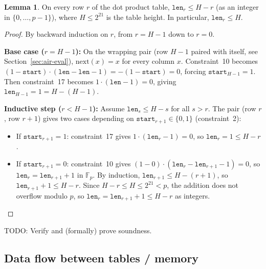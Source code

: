 \documentclass{article}
\theoremstyle{definition}
\newcommand{\Fp}{\mathbb F_p}
\newtheorem{lemma}{Lemma}
\begin{document}
\vspace{5mm}

\begin{lemma}\label{lem:len-bound}
On every row $r$ of the dot product table, $\texttt{len}_r \leq H - r$ (as an integer in $\{0, \dots, p-1\}$), where $H \leq 2^{21}$ is the table height. In particular, $\texttt{len}_r \leq H$.
\end{lemma}

\begin{proof}
By backward induction on $r$, from $r = H - 1$ down to $r = 0$.

\vspace{2mm}

\textbf{Base case ($r = H - 1$):} On the wrapping pair (row $H\!-\!1$ paired with itself, see Section~\ref{sec:air-eval}), $\text{next}(x) = x$ for every column $x$. Constraint~10 becomes $(1 - \texttt{start}) \cdot (\texttt{len} - \texttt{len} - 1) = -(1 - \texttt{start}) = 0$, forcing $\texttt{start}_{H-1} = 1$. Then constraint~17 becomes $1 \cdot (\texttt{len} - 1) = 0$, giving $\texttt{len}_{H-1} = 1 = H - (H-1)$.

\vspace{2mm}

\textbf{Inductive step ($r < H - 1$):} Assume $\texttt{len}_s \leq H - s$ for all $s > r$. The pair (row $r$, row $r\!+\!1$) gives two cases depending on $\texttt{start}_{r+1} \in \{0,1\}$ (constraint~2):

\begin{itemize}
    \item If $\texttt{start}_{r+1} = 1$: constraint~17 gives $1 \cdot (\texttt{len}_r - 1) = 0$, so $\texttt{len}_r = 1 \leq H - r$.
    \item If $\texttt{start}_{r+1} = 0$: constraint~10 gives $(1 - 0) \cdot (\texttt{len}_r - \texttt{len}_{r+1} - 1) = 0$, so $\texttt{len}_r = \texttt{len}_{r+1} + 1$ in $\Fp$. By induction, $\texttt{len}_{r+1} \leq H - (r+1)$, so $\texttt{len}_{r+1} + 1 \leq H - r$. Since $H - r \leq H \leq 2^{21} < p$, the addition does not overflow modulo $p$, so $\texttt{len}_r = \texttt{len}_{r+1} + 1 \leq H - r$ as integers.
\end{itemize}
\end{proof}

\vspace{3mm}

TODO: Verify and (formally) prove soundness.

\subsection{Data flow between tables / memory}
\end{document}
